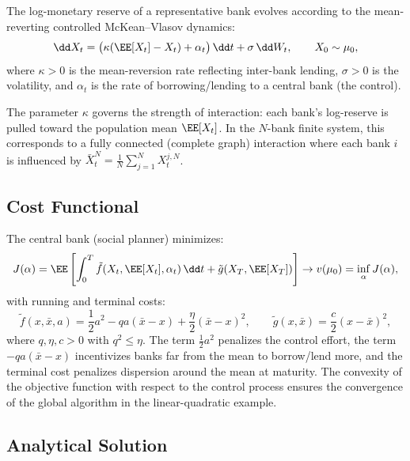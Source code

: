 \documentclass[11pt]{article}
\begin{document}
The log-monetary reserve of a representative bank evolves according to the mean-reverting controlled McKean--Vlasov dynamics:
\begin{equation}\label{eq:systemic-sde}
  \dd X_t = \big(\kappa(\EE[X_t] - X_t) + \alpha_t\big)\,\dd t + \sigma\,\dd W_t, \qquad X_0 \sim \mu_0,
\end{equation}
where $\kappa > 0$ is the mean-reversion rate reflecting inter-bank lending, $\sigma > 0$ is the volatility, and $\alpha_t$ is the rate of borrowing/lending to a central bank (the control).

The parameter $\kappa$ governs the strength of interaction: each bank's log-reserve is pulled toward the population mean $\EE[X_t]$. In the $N$-bank finite system, this corresponds to a fully connected (complete graph) interaction where each bank $i$ is influenced by $\bar{X}_t^N = \frac{1}{N}\sum_{j=1}^N X_t^{j,N}$.

\subsection{Cost Functional}

The central bank (social planner) minimizes:
\begin{equation}\label{eq:systemic-cost}
  J(\alpha) = \EE\left[\int_0^T \tilde{f}(X_t, \EE[X_t], \alpha_t)\,\dd t + \tilde{g}(X_T, \EE[X_T])\right] \to v(\mu_0) = \inf_\alpha J(\alpha),
\end{equation}
with running and terminal costs:
\begin{equation}\label{eq:systemic-costs-detail}
  \tilde{f}(x, \bar{x}, a) = \frac{1}{2}a^2 - qa(\bar{x} - x) + \frac{\eta}{2}(\bar{x} - x)^2, \qquad \tilde{g}(x, \bar{x}) = \frac{c}{2}(x - \bar{x})^2,
\end{equation}
where $q, \eta, c > 0$ with $q^2 \le \eta$. The term $\frac{1}{2}a^2$ penalizes the control effort, the term $-qa(\bar{x} - x)$ incentivizes banks far from the mean to borrow/lend more, and the terminal cost penalizes dispersion around the mean at maturity. The convexity of the objective function with respect to the control process ensures the convergence of the global algorithm in the linear-quadratic example.

\subsection{Analytical Solution}
\end{document}
